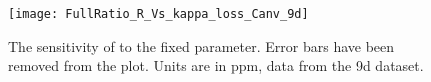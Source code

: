  


\begin{figure}
    \centering
    \texttt{[image: FullRatio\_R\_Vs\_kappa\_loss\_Canv\_9d]}
    \caption[Scan over fixed \K]{The sensitivity of \R to the fixed \K parameter. Error bars have been removed from the plot. Units are in ppm, data from the 9d dataset.}
    \label{fig:kappaLossScan}
\end{figure}


